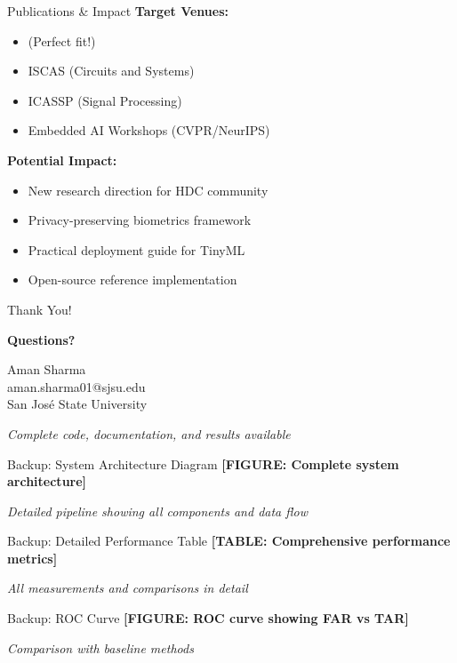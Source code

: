 \documentclass[aspectratio=169]{beamer}
\begin{document}
\begin{frame}{Publications \& Impact}
\textbf{Target Venues:}
\begin{itemize}
    \item {} (Perfect fit!)
    \item ISCAS (Circuits and Systems)
    \item ICASSP (Signal Processing)
    \item Embedded AI Workshops (CVPR/NeurIPS)
\end{itemize}

\vspace{1em}

\textbf{Potential Impact:}
\begin{itemize}
    \item New research direction for HDC community
    \item Privacy-preserving biometrics framework
    \item Practical deployment guide for TinyML
    \item Open-source reference implementation
\end{itemize}
\end{frame}

\begin{frame}[standout]
\Huge Thank You!

\vspace{2em}

\large
\textbf{Questions?}

\vspace{2em}

\normalsize
Aman Sharma\\
aman.sharma01@sjsu.edu\\
San José State University\\

\vspace{1em}

\textit{Complete code, documentation, and results available}
\end{frame}

\appendix

\begin{frame}{Backup: System Architecture Diagram}
\textbf{[FIGURE: Complete system architecture]}

\textit{Detailed pipeline showing all components and data flow}
\end{frame}

\begin{frame}{Backup: Detailed Performance Table}
\textbf{[TABLE: Comprehensive performance metrics]}

\textit{All measurements and comparisons in detail}
\end{frame}

\begin{frame}{Backup: ROC Curve}
\textbf{[FIGURE: ROC curve showing FAR vs TAR]}

\textit{Comparison with baseline methods}
\end{frame}
\end{document}
